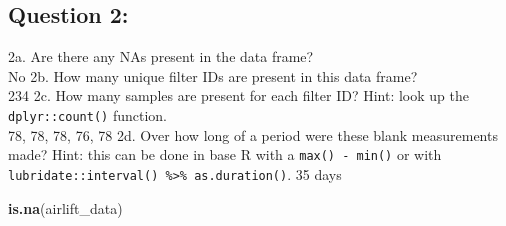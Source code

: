 \documentclass[
]{article}
\newenvironment{Shaded}{\begin{snugshade}}{\end{snugshade}}
\newcommand{\FunctionTok}[1]{\textcolor[rgb]{0.13,0.29,0.53}{\textbf{#1}}}
\newcommand{\NormalTok}[1]{#1}
\begin{document}
\hypertarget{question-2}{%
\subsection{Question 2:}\label{question-2}}

2a. Are there any NAs present in the data frame?\\
No 2b. How many unique filter IDs are present in this data frame?\\
234 2c. How many samples are present for each filter ID? Hint: look up
the \texttt{dplyr::count()} function.\\
78, 78, 78, 76, 78 2d. Over how long of a period were these blank
measurements made? Hint: this can be done in base R with a
\texttt{max()\ -\ min()} or with
\texttt{lubridate::interval()\ \%\textgreater{}\%\ as.duration()}. 35
days

\begin{Shaded}
\begin{Highlighting}[]
\FunctionTok{is.na}\NormalTok{(airlift\_data)}
\end{Highlighting}
\end{Shaded}
\end{document}
